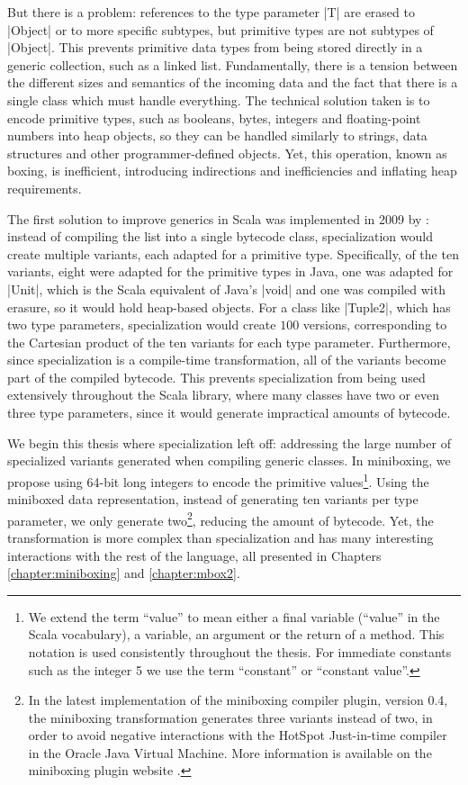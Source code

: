 But there is a problem: references to the type parameter |T| are erased to |Object| or to more specific subtypes, but primitive types are not subtypes of |Object|. This prevents primitive data types from being stored directly in a generic collection, such as a linked list. Fundamentally, there is a tension between the different sizes and semantics of the incoming data and the fact that there is a single class which must handle everything. The technical solution taken is to encode primitive types, such as booleans, bytes, integers and floating-point numbers into heap objects, so they can be handled similarly to strings, data structures and other programmer-defined objects. Yet, this operation, known as boxing, is inefficient, introducing indirections and inefficiencies and inflating heap requirements.

The first solution to improve generics in Scala was implemented in 2009 by  \cite{iuli-thesis, specialization-iuli}: instead of compiling the list into a single bytecode class, specialization would create multiple variants, each adapted for a primitive type. Specifically, of the ten variants, eight were adapted for the primitive types in Java, one was adapted for |Unit|, which is the Scala equivalent of Java's |void| and one was compiled with erasure, so it would hold heap-based objects. For a class like |Tuple2|, which has two type parameters, specialization would create $100$ versions, corresponding to the Cartesian product of the ten variants for each type parameter. Furthermore, since specialization is a compile-time transformation, all of the variants become part of the compiled bytecode. This prevents specialization from being used extensively throughout the Scala library, where many classes have two or even three type parameters, since it would generate impractical amounts of bytecode.

We begin this thesis where specialization left off: addressing the large number of specialized variants generated when compiling generic classes. In miniboxing, we propose using 64-bit long integers to encode the primitive values\footnote{We extend the term ``value'' to mean either a final variable (``value'' in the Scala vocabulary), a variable, an argument or the return of a method. This notation is used consistently throughout the thesis. For immediate constants such as the integer 5 we use the term ``constant'' or ``constant value''.}. Using the miniboxed data representation, instead of generating ten variants per type parameter, we only generate two\footnote{In the latest implementation of the miniboxing compiler plugin, version 0.4, the miniboxing transformation generates three variants instead of two, in order to avoid negative interactions with the HotSpot Just-in-time compiler in the Oracle Java Virtual Machine. More information is available on the miniboxing plugin website \cite{miniboxing-www}.}, reducing the amount of bytecode. Yet, the transformation is more complex than specialization and has many interesting interactions with the rest of the language, all presented in Chapters \ref{chapter:miniboxing} and \ref{chapter:mbox2}.

